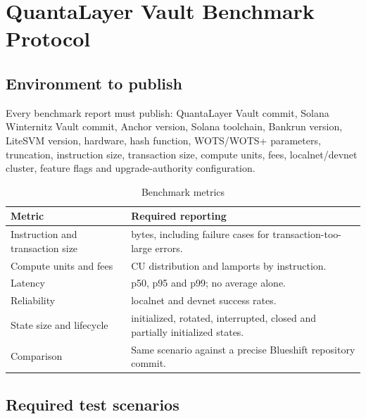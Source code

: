 \documentclass[11pt,a4paper,oneside,parskip=false]{scrartcl}
\begin{document}
\section{QuantaLayer Vault Benchmark Protocol}
\label{appendix:vault-benchmark}

\subsection{Environment to publish}

Every benchmark report must publish: QuantaLayer Vault commit, Solana Winternitz Vault commit, Anchor version, Solana toolchain, Bankrun version, LiteSVM version, hardware, hash function, WOTS/WOTS+ parameters, truncation, instruction size, transaction size, compute units, fees, localnet/devnet cluster, feature flags and upgrade-authority configuration.

\begin{table}[htbp]
\centering
\caption{Benchmark metrics}
\label{tab:benchmark-metrics}
\small
\begin{tabularx}{\textwidth}{L{0.32\textwidth}Y}
\toprule
\textbf{Metric} & \textbf{Required reporting} \\
\midrule
Instruction and transaction size & bytes, including failure cases for transaction-too-large errors. \\
Compute units and fees & CU distribution and lamports by instruction. \\
Latency & p50, p95 and p99; no average alone. \\
Reliability & localnet and devnet success rates. \\
State size and lifecycle & initialized, rotated, interrupted, closed and partially initialized states. \\
Comparison & Same scenario against a precise Blueshift repository commit. \\
\bottomrule
\end{tabularx}
\end{table}

\subsection{Required test scenarios}
\end{document}
